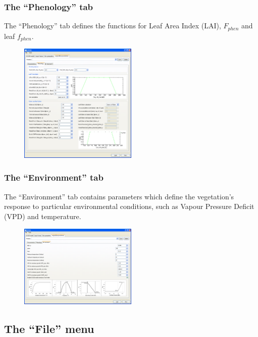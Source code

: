 \documentclass[10pt,a4paper]{article}
\begin{document}
\subsubsection{The ``Phenology'' tab}

The ``Phenology'' tab defines the functions for Leaf Area Index (LAI), $F_{phen}$ and leaf 
$f_{phen}$.

\begin{figure}[H]
\centering
\includegraphics[width=0.5\textwidth]{images/ss/veg-phenology-panel}
\end{figure}

\subsubsection{The ``Environment'' tab}

The ``Environment'' tab contains parameters which define the vegetation's response to particular 
environmental conditions, such as Vapour Pressure Deficit (VPD) and temperature.

\begin{figure}[H]
\centering
\includegraphics[width=0.5\textwidth]{images/ss/veg-environment-panel}
\end{figure}


\subsection{The ``File'' menu}
\end{document}
